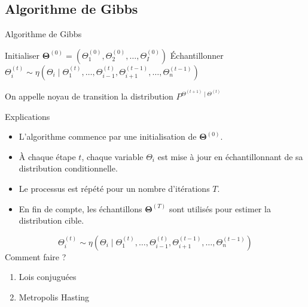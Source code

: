 \documentclass{beamer}
\newcommand{\fr}[1]{#1}
\newcommand{\en}[1]{}
\begin{document}
\subsection{Algorithme de Gibbs}
\begin{frame}{Algorithme de Gibbs}

    \begin{algorithm}[H]
        \caption{Algorithme de Gibbs}
        \begin{algorithmic}[1]
            \State Initialiser $\mathbf{\Theta}^{(0)} = (\Theta_1^{(0)}, \Theta_2^{(0)}, \ldots, \Theta_I^{(0)})$
                    \State Échantillonner 
                    \State \quad$\Theta_i^{(t)} \sim \eta\left(\Theta_i \mid \Theta_1^{(t)}, \ldots, \Theta_{i-1}^{(t)}, \Theta_{i+1}^{(t-1)}, \ldots, \Theta_n^{(t-1)}\right)$
                \EndFor
            \EndFor
        \end{algorithmic}
    \end{algorithm}
    
    
\en{The transition kernel is the distribution}\fr{On appelle noyau de transition la distribution } $P^{\Theta^{(t+1)}\mid\Theta^{(t)}}$ 
\end{frame}

\begin{frame}{Explications}
    \begin{itemize}
        \item L'algorithme commence par une initialisation de $\mathbf{\Theta}^{(0)}$.
        \item À chaque étape $t$, chaque variable $\Theta_i$ est mise à jour en échantillonnant de sa distribution conditionnelle.
        \item Le processus est répété pour un nombre d'itérations $T$.
        \item En fin de compte, les échantillons $\mathbf{\Theta}^{(T)}$ sont utilisés pour estimer la distribution cible.
    \end{itemize}
\end{frame}



\begin{frame}
$$\Theta_i^{(t)} \sim \eta\left(\Theta_i \mid \Theta_1^{(t)}, \ldots, \Theta_{i-1}^{(t)}, \Theta_{i+1}^{(t-1)}, \ldots, \Theta_n^{(t-1)}\right)$$
Comment faire ?

\begin{enumerate}
\item Lois conjuguées
\item Metropolis Hasting
\end{enumerate}
\end{frame}
\end{document}
